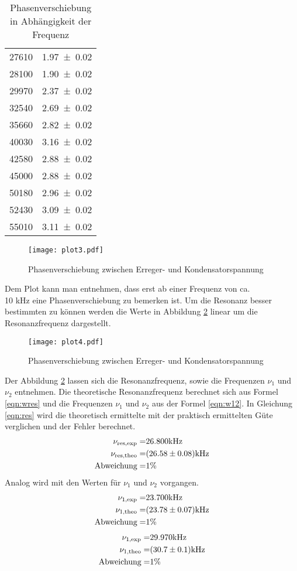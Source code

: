 \begin{table}
\begin{tabular}{c c}
	27610 	& \num{1.97 +- 0.02} \\
	28100 	& \num{1.90 +- 0.02} \\
	29970 	& \num{2.37 +- 0.02} \\
	32540 	& \num{2.69 +- 0.02} \\
	35660 	& \num{2.82 +- 0.02} \\
	40030 	& \num{3.16 +- 0.02} \\
	42580 	& \num{2.88 +- 0.02} \\
	45000 	& \num{2.88 +- 0.02} \\
	50180 	& \num{2.96 +- 0.02} \\
	52430 	& \num{3.09 +- 0.02} \\
	55010 	& \num{3.11 +- 0.02} \\
  \end{tabular}
  \caption{Phasenverschiebung in Abhängigkeit der Frequenz}
  \label{tab:phi}
\end{table}
\begin{figure}
  \centering
  \texttt{[image: plot3.pdf]}
  \caption{Phasenverschiebung zwischen Erreger- und Kondensatorspannung}
  \label{fig:logphi}
\end{figure}
Dem Plot kann man entnehmen, dass erst ab einer Frequenz von ca. \\
 10 kHz eine Phasenverschiebung zu bemerken ist. Um die Resonanz besser bestimmten zu können werden die Werte in Abbildung \ref{fig:Phi} linear um die Resonanzfrequenz dargestellt.
\begin{figure}
  \centering
  \texttt{[image: plot4.pdf]}
  \caption{Phasenverschiebung zwischen Erreger- und Kondensatorspannung}
  \label{fig:Phi}
\end{figure}
Der Abbildung \ref{fig:Phi} lassen sich die Resonanzfrequenz, sowie die Frequenzen $\nu_1$ und $\nu_2$ entnehmen. Die theoretische Resonanzfrequenz berechnet sich aus Formel \ref{eqn:wres} und die Frequenzen $\nu_1$ und $\nu_2$ aus der Formel \ref{eqn:w12}. In Gleichung \ref{eqn:res} wird die theoretisch ermittelte mit der praktisch ermittelten Güte verglichen und der Fehler berechnet.
\begin{eqnarray}
  \nu_\text{res,exp} =& 26.800 \text{kHz}			\\
  \nu_\text{res,theo} =& (\num{26.58 +- 0.08}) \text{kHz} \\
  \text{Abweichung} =& 1 \%
  \label{eqn:res}
\end{eqnarray}
Analog wird mit den Werten für $\nu_1$ und $\nu_2$ vorgangen.
\begin{eqnarray}
  \nu_\text{1,exp} =& 23.700 \text{kHz}                 \\
  \nu_\text{1,theo} =& (\num{23.78 +- 0.07}) \text{kHz} \\
  \text{Abweichung} =& 1 \%
\end{eqnarray}
\begin{eqnarray}
  \nu_\text{1,exp} =& 29.970 \text{kHz}                 \\
  \nu_\text{1,theo} =& (\num{30.7 +- 0.1}) \text{kHz} \\
  \text{Abweichung} =& 1 \%
\end{eqnarray}

